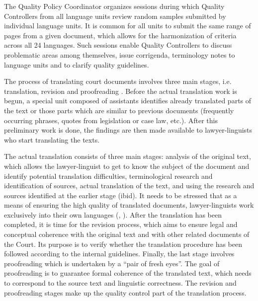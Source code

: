 \documentclass[output=paper]{langsci/langscibook}
\begin{document}
The Quality Policy Coordinator organizes sessions during which Quality Controllers from all language units review random samples submitted by individual language units. It is common for all units to submit the same range of pages from a given document, which allows for the harmonization of criteria across all 24 languages. Such sessions enable Quality Controllers to discuss problematic areas among themselves, issue corrigenda, terminology notes to language units and to clarify quality guidelines.

The process of translating court documents involves three main stages, i.e. translation, revision and proofreading \citep{Izzo2014b}. Before the actual translation work is begun, a special unit composed of assistants identifies already translated parts of the text or those parts which are similar to previous documents (frequently occurring phrases, quotes from legislation or case law, etc.). After this preliminary work is done, the findings are then made available to lawyer-linguists who start translating the texts.

The actual translation consists of three main stages: analysis of the original text, which allows the lawyer-linguist to get to know the subject of the document and identify potential translation difficulties, terminological research and identification of sources, actual translation of the text, and using the research and sources identified at the earlier stage (ibid). It needs to be stressed that as a means of ensuring the high quality of translated documents, lawyer-linguists work exclusively into their own languages (\citealt[201]{Šarčević2013}, \citealt[15]{McAuliffe2016}). After the translation has been completed, it is time for the revision process, which aims to ensure legal and conceptual coherence with the original text and with other related documents of the Court. Its purpose is to verify whether the translation procedure has been followed according to the internal guidelines. Finally, the last stage involves proofreading which is undertaken by a “pair of fresh eyes”. The goal of proofreading is to guarantee formal coherence of the translated text, which needs to correspond to the source text and linguistic correctness. The revision and proofreading stages make up the quality control part of the translation process.
\end{document}
